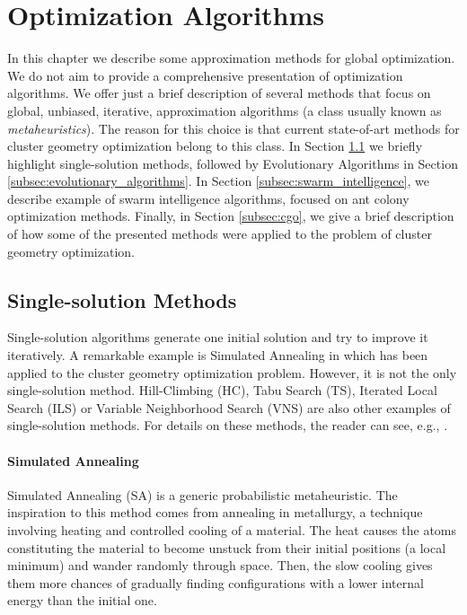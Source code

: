 \chapter{Optimization Algorithms}
	\label{chap:opt_alg}
		
	    In this chapter we describe some approximation methods for global optimization. We do not aim to provide a comprehensive presentation of optimization algorithms. We offer just a brief description of several methods that focus on global, unbiased, iterative, approximation algorithms (a class usually known as \emph{metaheuristics}). The reason for this choice is that current state-of-art methods for cluster geometry optimization belong to this class. In Section \ref{subsec:single_state_solution} we briefly highlight single-solution methods, followed by Evolutionary Algorithms in Section \ref{subsec:evolutionary_algorithms}. In Section \ref{subsec:swarm_intelligence}, we describe example of swarm intelligence algorithms, focused on ant colony optimization methods. Finally, in Section \ref{subsec:cgo}, we give a brief description of how some of the presented methods were applied to the problem of cluster geometry optimization. 
		\section{Single-solution Methods}
			\label{subsec:single_state_solution}
		 	Single-solution algorithms generate one initial solution and try to improve it iteratively. A remarkable example is Simulated Annealing in which has been applied to the cluster geometry optimization problem. However, it is not the only single-solution method. Hill-Climbing (HC), Tabu Search (TS), Iterated Local Search (ILS) or Variable Neighborhood Search (VNS) are also other examples of single-solution methods. For details on these methods, the reader can see, e.g., \cite{luke09}.  		
			
			\subsubsection*{Simulated Annealing}
			Simulated Annealing (SA) \cite{kirkpatrick83} is a generic probabilistic metaheuristic. The inspiration to this method comes from annealing in metallurgy, a technique involving heating and controlled cooling of a material. The heat causes the atoms constituting the material to become unstuck from their initial positions (a local minimum) and wander randomly through space. Then, the slow cooling gives them more chances of gradually finding configurations with a lower internal energy than the initial one.

